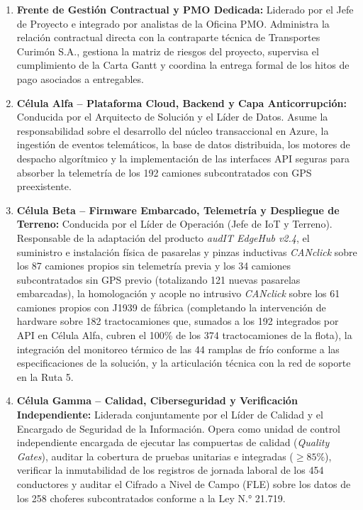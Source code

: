 \begin{enumerate}
  \item \textbf{Frente de Gestión Contractual y PMO Dedicada:} Liderado por el Jefe de Proyecto e integrado por analistas de la Oficina PMO. Administra la relación contractual directa con la contraparte técnica de Transportes Curimón S.A., gestiona la matriz de riesgos del proyecto, supervisa el cumplimiento de la Carta Gantt y coordina la entrega formal de los hitos de pago asociados a entregables.
  \item \textbf{Célula Alfa -- Plataforma Cloud, Backend y Capa Anticorrupción:} Conducida por el Arquitecto de Solución y el Líder de Datos. Asume la responsabilidad sobre el desarrollo del núcleo transaccional en Azure, la ingestión de eventos telemáticos, la base de datos distribuida, los motores de despacho algorítmico y la implementación de las interfaces API seguras para absorber la telemetría de los 192 camiones subcontratados con GPS preexistente.
  \item \textbf{Célula Beta -- Firmware Embarcado, Telemetría y Despliegue de Terreno:} Conducida por el Líder de Operación (Jefe de IoT y Terreno). Responsable de la adaptación del producto \textit{audIT EdgeHub v2.4}, el suministro e instalación física de pasarelas y pinzas inductivas \textit{CANclick} sobre los 87 camiones propios sin telemetría previa y los 34 camiones subcontratados sin GPS previo (totalizando 121 nuevas pasarelas embarcadas), la homologación y acople no intrusivo \textit{CANclick} sobre los 61 camiones propios con J1939 de fábrica (completando la intervención de hardware sobre 182 tractocamiones que, sumados a los 192 integrados por API en Célula Alfa, cubren el 100\% de los 374 tractocamiones de la flota), la integración del monitoreo térmico de las 44 ramplas de frío conforme a las especificaciones de la solución, y la articulación técnica con la red de soporte en la Ruta 5.
  \item \textbf{Célula Gamma -- Calidad, Ciberseguridad y Verificación Independiente:} Liderada conjuntamente por el Líder de Calidad y el Encargado de Seguridad de la Información. Opera como unidad de control independiente encargada de ejecutar las compuertas de calidad (\textit{Quality Gates}), auditar la cobertura de pruebas unitarias e integradas ($\ge 85\%$), verificar la inmutabilidad de los registros de jornada laboral de los 454 conductores y auditar el Cifrado a Nivel de Campo (FLE) sobre los datos de los 258 choferes subcontratados conforme a la Ley N.° 21.719.
\end{enumerate}

